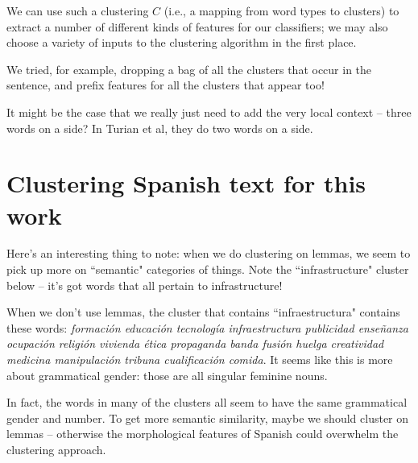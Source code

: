 We can use such a clustering $C$ (i.e., a mapping from word types to clusters)
to extract a number of different kinds of features for our classifiers;
we may also choose a variety of inputs to the clustering algorithm in the first
place.


We tried, for example, dropping a bag of all the clusters that occur in the
sentence, and prefix features for all the clusters that appear too!

It might be the case that we really just need to add the very local context --
three words on a side? In Turian et al, they do two words on a side.



\section{Clustering Spanish text for this work}


Here's an interesting thing to note: when we do clustering on lemmas, we seem
to pick up more on ``semantic" categories of things. Note the ``infrastructure"
cluster below -- it's got words that all pertain to infrastructure!

When we don't use lemmas, the cluster that contains ``infraestructura" contains
these words: \emph{formación educación tecnología infraestructura publicidad
enseñanza ocupación religión vivienda ética propaganda banda fusión huelga
creatividad medicina manipulación tribuna cualificación comida}. It seems like
this is more about grammatical gender: those are all singular feminine nouns.

In fact, the words in many of the clusters all seem to have the same
grammatical gender and number. To get more semantic similarity, maybe we should
cluster on lemmas -- otherwise the morphological features of Spanish could
overwhelm the clustering approach.

